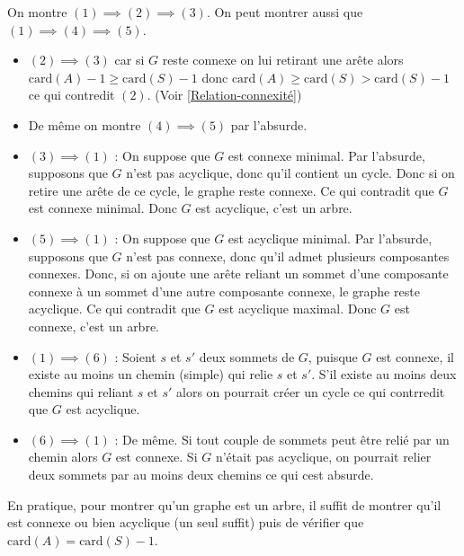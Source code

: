 \begin{myproof}
  On montre $(1) \implies (2) \implies (3)$. On peut montrer aussi que $(1) \implies (4) \implies(5)$. 

  \begin{itemize}

      \item $(2) \implies (3)$ car si $G$ reste connexe on lui retirant une arête alors $\mathrm{card} (A) - 1 \ge \mathrm{card} (S) - 1$ donc $\mathrm{card} (A) \ge \mathrm{card} (S) > \mathrm{card}(S) - 1$ ce qui contredit $(2)$. (Voir \ref{Relation-connexité})

      \item De même on montre $(4) \implies(5)$ par l'absurde. 
  

      \item $(3) \implies(1)$ : On suppose que $G$ est connexe minimal. Par l'absurde, supposons que $G$ n'est pas acyclique, donc qu'il contient un cycle. Donc si on retire une arête de ce cycle, le graphe reste connexe. Ce qui contradit que $G$ est connexe minimal. Donc $G$ est acyclique, c'est un arbre.

      \item $(5) \implies (1)$ : On suppose que $G$ est acyclique minimal. Par l'absurde, supposons que $G$ n'est pas connexe, donc qu'il admet plusieurs composantes connexes. Donc, si on ajoute une arête reliant un sommet d'une composante connexe à un sommet d'une autre composante connexe, le graphe reste acyclique. Ce qui contradit que $G$ est acyclique maximal. Donc $G$ est connexe, c'est un arbre.

      \item $(1) \implies (6)$ : Soient $s$ et $s'$ deux sommets de $G$, puisque $G$ est connexe, il existe au moins un chemin (simple) qui relie $s$ et $s'$. S'il existe au moins deux chemins qui reliant $s$ et $s'$ alors on pourrait créer un cycle ce qui contrredit que $G$ est acyclique.

      \item $(6) \implies (1)$ : De même. Si tout couple de sommets peut être relié par un chemin alors $G$ est connexe. Si $G$ n'était pas acyclique, on pourrait relier deux sommets par au moins deux chemins ce qui cest absurde.  

  \end{itemize}
\end{myproof}

\begin{note}
En pratique, pour montrer qu'un graphe est un arbre, il suffit de montrer qu'il est connexe ou bien acyclique (un seul suffit) puis de vérifier que $\mathrm{card} (A) = \mathrm{card} (S) - 1$.
\end{note}

